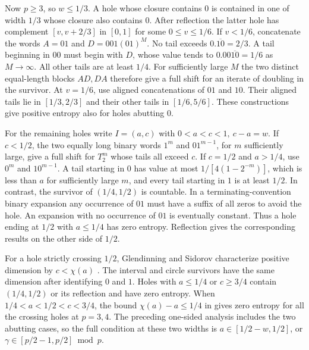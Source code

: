 \documentclass[11pt,reqno,a4paper]{amsart}
\theoremstyle{remark}
\begin{document}
Now \(p\ge3\), so \(w\le1/3\). A hole whose closure contains \(0\)
is contained in one of width \(1/3\) whose closure also contains
\(0\). After reflection the latter hole has complement
\([v,v+2/3]\) in \([0,1]\) for some \(0\le v\le1/6\).
If \(v<1/6\), concatenate the words \(A=01\) and
\(D=001(01)^M\). No tail exceeds \(0.\overline{10}=2/3\). A tail
beginning in \(00\) must begin with \(D\), whose value tends to
\(0.00\overline{10}=1/6\) as \(M\to\infty\). All other tails are
at least \(1/4\). For sufficiently large \(M\) the two distinct
equal-length blocks \(AD,DA\) therefore give a full shift for
an iterate of doubling in the survivor. At \(v=1/6\), use aligned
concatenations of \(01\) and \(10\). Their aligned tails lie in
\([1/3,2/3]\) and their other tails in \([1/6,5/6]\). These
constructions give positive entropy also for holes abutting \(0\).

For the remaining holes write \(I=(a,c)\) with
\(0<a<c<1,\ c-a=w\). If \(c<1/2\), the two equally long binary
words \(1^m\) and \(01^{m-1}\), for \(m\) sufficiently large, give
a full shift for \(T_2^m\) whose tails all exceed \(c\).
If \(c=1/2\) and \(a>1/4\), use \(0^m\) and \(10^{m-1}\).
A tail starting in \(0\) has value at most
\(1/[4(1-2^{-m})]\), which is less than \(a\) for sufficiently large
\(m\), and every tail starting in \(1\) is at least \(1/2\).
In contrast, the survivor of \((1/4,1/2)\) is countable. In a
terminating-convention binary expansion any occurrence of \(01\)
must have a suffix of all zeros to avoid the hole. An expansion
with no occurrence of \(01\) is eventually constant. Thus a
hole ending at \(1/2\) with \(a\le1/4\) has zero entropy.
Reflection gives the corresponding results on the other side
of \(1/2\).

For a hole strictly crossing \(1/2\), Glendinning and Sidorov
characterize positive dimension by \(c<\chi(a)\)
\cite[Theorems~1.2 and~2.13]{app-glendinning-sidorov}. The interval
and circle survivors have the same dimension after identifying
\(0\) and \(1\). Holes with \(a\le1/4\) or \(c\ge3/4\) contain \((1/4,1/2)\) or its reflection
and have zero entropy. When \(1/4<a<1/2<c<3/4\), the bound
\(\chi(a)-a\le1/4\) in \cite[Proposition~3.3]{app-glendinning-sidorov}
gives zero entropy for all the crossing holes at \(p=3,4\).
The preceding one-sided analysis includes the two abutting cases,
so the full condition at these two widths is
\(a\in[1/2-w,1/2]\), or
\(\gamma\in[p/2-1,p/2]\bmod p\).
\end{document}
